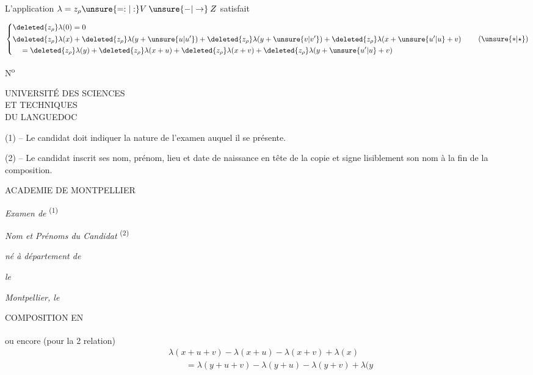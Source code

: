 L'application $\lambda=z_\rho\unsure{=:|:}V\mathbin{\unsure{-|\to}}Z$ satisfait

\[
 \left\{\begin{aligned}
 &\deleted{z_\rho}\lambda(0)=0\\
 &\begin{aligned}
 &\deleted{z_\rho}\lambda(x)+\deleted{z_\rho}\lambda(y+\unsure{u|u'})
 +\deleted{z_\rho}\lambda(y+\unsure{v|v'})+\deleted{z_\rho}\lambda(x+\unsure{u'|u}+v)\\
 &\quad=\deleted{z_\rho}\lambda(y)+\deleted{z_\rho}\lambda(x+u)
 +\deleted{z_\rho}\lambda(x+v)+\deleted{z_\rho}\lambda(y+\unsure{u'|u}+v)
 \end{aligned}
 \end{aligned}\right. \tag*{$(\unsure{*|\star})$}
\]

N\textsuperscript{o}

UNIVERSITÉ DES SCIENCES\\
ET TECHNIQUES\\
DU LANGUEDOC

(1) -- Le candidat doit indiquer la nature de l'examen auquel il se présente.

(2) -- Le candidat inscrit ses nom, prénom, lieu et date de naissance en tête de la copie et signe lisiblement son nom à la fin de la composition.

ACADEMIE DE MONTPELLIER

\textit{Examen de} \textsuperscript{(1)} \dotfill\\
\mbox{}\dotfill

\textit{Nom et Prénoms du Candidat} \textsuperscript{(2)} \dotfill

\textit{né à} \dotfill\quad \textit{département de} \dotfill

\textit{le} \dotfill{}

\textit{Montpellier, le} \dotfill{}

COMPOSITION EN \dotfill

ou encore (pour la 2\textsuperscript{} relation)
\[
 \begin{aligned}
 &\lambda(x+u+v)-\lambda(x+u)-\lambda(x+v)+\lambda(x)\\
 &\qquad=\lambda(y+u+v)-\lambda(y+u)-\lambda(y+v)+\lambda(y
 \end{aligned}
\]

